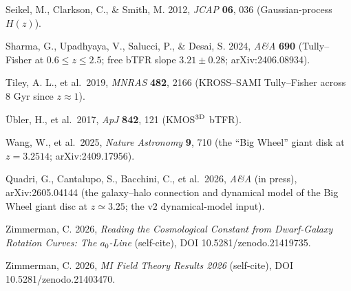 \documentclass[
]{article}
\begin{document}
Seikel, M., Clarkson, C., \& Smith, M. 2012, \emph{JCAP} \textbf{06},
036 (Gaussian-process \(H(z)\)).

Sharma, G., Upadhyaya, V., Salucci, P., \& Desai, S. 2024, \emph{A\&A}
\textbf{690} (Tully--Fisher at \(0.6\le z\le2.5\); free bTFR slope
\(3.21\pm0.28\); arXiv:2406.08934).

Tiley, A. L., et al.~2019, \emph{MNRAS} \textbf{482}, 2166 (KROSS--SAMI
Tully--Fisher across 8 Gyr since \(z\approx1\)).

Übler, H., et al.~2017, \emph{ApJ} \textbf{842}, 121 (KMOS\(^{3\rm D}\)
bTFR).

Wang, W., et al.~2025, \emph{Nature Astronomy} \textbf{9}, 710 (the
``Big Wheel'' giant disk at \(z=3.2514\); arXiv:2409.17956).

Quadri, G., Cantalupo, S., Bacchini, C., et al.~2026, \emph{A\&A} (in
press), arXiv:2605.04144 (the galaxy--halo connection and dynamical
model of the Big Wheel giant disc at \(z\simeq3.25\); the v2
dynamical-model input).

Zimmerman, C. 2026, \emph{Reading the Cosmological Constant from
Dwarf-Galaxy Rotation Curves: The \(a_0\)-Line} (self-cite), DOI
10.5281/zenodo.21419735.

Zimmerman, C. 2026, \emph{MI Field Theory Results 2026} (self-cite), DOI
10.5281/zenodo.21403470.
\end{document}
